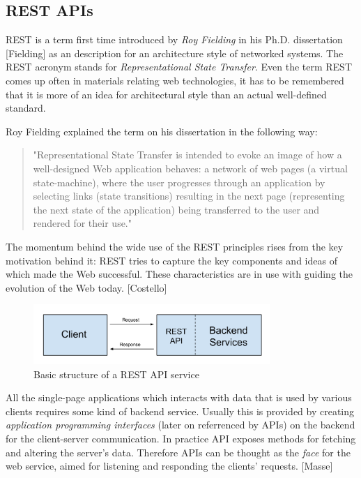\subsection{REST APIs}

REST is a term first time introduced by \textit{Roy Fielding} in his Ph.D. dissertation [Fielding] as an description for an architecture style of networked systems. The REST acronym stands for \textit{Representational State Transfer}. Even the term REST comes up often in materials relating web technologies, it has to be remembered that it is more of an idea for architectural style than an actual well-defined standard. 

Roy Fielding explained the term on his dissertation in the following way:
\begin{quote}
"Representational State Transfer is intended to evoke an image of how a well-designed Web application behaves: a network of web pages (a virtual state-machine), where the user progresses through an application by selecting links (state transitions) resulting in the next page (representing the next state of the application) being transferred to the user and rendered for their use."
\end{quote}

The momentum behind the wide use of the REST principles rises from the key motivation behind it: REST tries to capture the key components and ideas of which made the Web successful. These characteristics are in use with guiding the evolution of the Web today. [Costello]

\begin{figure}[t]
\begin{center}
\includegraphics[width=0.8\textwidth]{assets/restapi.png}
\end{center}
\caption{Basic structure of a REST API service}
\label{fig:restapi}
\end{figure}

All the single-page applications which interacts with data that is used by various clients requires some kind of backend service. Usually this is provided by creating \textit{application programming interfaces} (later on referrenced by APIs) on the backend for the client-server communication. In practice API exposes methods for fetching and altering the server's data. Therefore APIs can be thought as the \textit{face} for the web service, aimed for listening and responding the clients' requests. [Masse]

